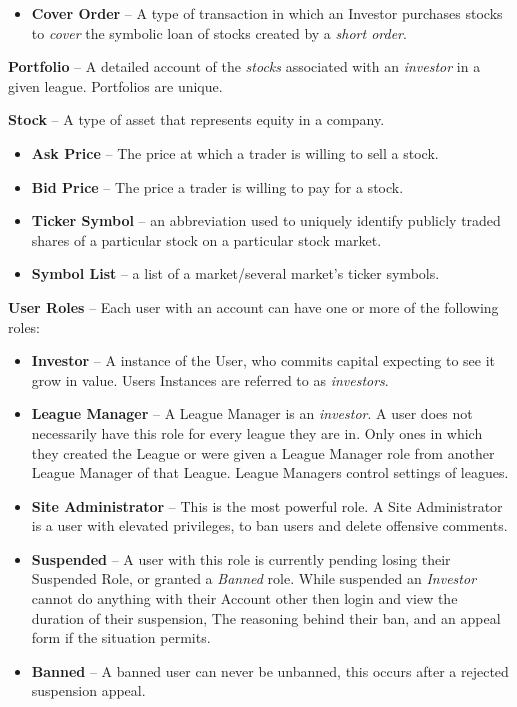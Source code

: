 {\begin{itemize}
\begin{itemize}
		a certain number of stocks (using their existing Margin) and sells them at market price,
		expecting the stock value to decrease and to make a profit when exiting the position. 
		Exiting is called a \emph{cover}. \cite{inv:short}
	\item \textbf{Cover Order} -- A type of transaction in which an Investor purchases stocks to 
		\emph{cover} the symbolic loan of stocks created by a \emph{short order}. \cite{inv:cover}
	\end{itemize}
\end{itemize}
\textbf{Portfolio} -- A detailed account of the \emph{stocks} associated with an \emph{investor} 
in a given league. Portfolios are unique. 

\textbf{Stock} -- A type of asset that represents equity in a company.
\begin{itemize}
\item \textbf{Ask Price} -- The price at which a trader is willing to sell a stock.
\item \textbf{Bid Price} -- The price a trader is willing to pay for a stock.
\item \textbf{Ticker Symbol} -- an abbreviation used to uniquely identify publicly traded shares of a particular stock on a particular stock market.
\item \textbf{Symbol List} -- a list of a market/several market's ticker symbols.
\end{itemize}
\textbf{User Roles} -- Each user with an account can have one or more of the following roles:
\begin{itemize}
\item \textbf{Investor} -- A instance of the User, who commits capital expecting to see it grow in value. Users Instances are referred 
to as \emph{investors}. 
\item \textbf{League Manager} -- A League Manager is an \emph{investor}.  A user does not necessarily have this role for every league they are in.  Only ones in which they created the League or were given a League Manager role from another League Manager of that League. League Managers control settings of leagues.
\item \textbf{Site Administrator} -- This is the most powerful role. A Site Administrator is a user with elevated privileges, to ban users and delete offensive comments.
\item \textbf{Suspended} -- A user with this role is currently pending losing their Suspended Role, or granted a \emph{Banned} role.  While suspended an \emph{Investor} cannot do anything with their Account other then login and view the duration of their suspension, The reasoning behind their ban, and an appeal form if the situation permits.
\item \textbf{Banned} -- A banned user can never be unbanned, this occurs after a rejected suspension appeal.
\end{itemize}
}